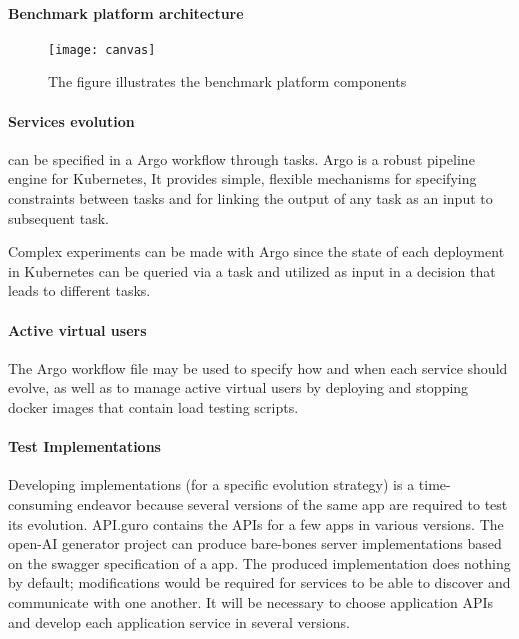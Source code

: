\paragraph{Benchmark platform architecture}

\begin{figure}[htbp]
    \centering
    \texttt{[image: canvas]}
    \caption{The figure illustrates the benchmark platform components}
    \label{fig:canvas}
\end{figure}

\paragraph{Services evolution} can be specified in a Argo workflow through tasks.
Argo is a robust pipeline engine for Kubernetes, It provides simple, flexible mechanisms for specifying constraints between tasks and for linking the output of any task as an input to subsequent task.

Complex experiments can be made with Argo since the state of each deployment in Kubernetes can be queried via a task and utilized as input in a decision that leads to different tasks.

\paragraph{Active virtual users} The Argo workflow file may be used to specify how and when each service should evolve, as well as to manage active virtual users by deploying and stopping docker images that contain load testing scripts.


\paragraph{Test Implementations}
Developing implementations (for a specific evolution strategy) is a time-consuming endeavor because several versions of the same app are required to test its evolution.
API.guro contains the APIs for a few apps in various versions.
The open-AI generator project can produce bare-bones server implementations based on the swagger specification of a app.
The produced implementation does nothing by default; modifications would be required for services to be able to discover and communicate with one another.
It will be necessary to choose application APIs and develop each application service in several versions.

